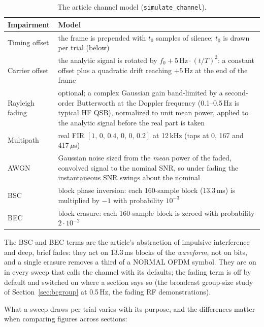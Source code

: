 \begin{table}[H]
    \centering
    \caption{The article channel model (\texttt{simulate\_channel}).}
    \label{tab:chan_article}
    \small
    \begin{tabular}{@{}lp{9.4cm}@{}}
    \toprule
    \textbf{Impairment} & \textbf{Model} \\
    \midrule
    Timing offset & the frame is prepended with $t_0$ samples of
        silence; $t_0$ is drawn per trial (below) \\
    Carrier offset & the analytic signal is rotated by
        $f_0 + 5\,\mathrm{Hz}\cdot(t/T)^2$: a constant offset plus a
        quadratic drift reaching $+5$\,Hz at the end of the frame \\
    Rayleigh fading & optional; a complex Gaussian gain band-limited by
        a second-order Butterworth at the Doppler frequency
        (0.1--0.5\,Hz is typical HF QSB), normalized to unit mean power,
        applied to the analytic signal before the real part is taken \\
    Multipath & real FIR $[1,\,0,\,0.4,\,0,\,0,\,0.2]$ at 12\,kHz
        (taps at 0, 167 and 417\,$\mu$s) \\
    AWGN & Gaussian noise sized from the \emph{mean} power of the
        faded, convolved signal to the nominal SNR, so under fading the
        instantaneous SNR swings about the nominal \\
    BSC & block phase inversion: each 160-sample block (13.3\,ms) is
        multiplied by $-1$ with probability $10^{-3}$ \\
    BEC & block erasure: each 160-sample block is zeroed with
        probability $2\cdot10^{-2}$ \\
    \bottomrule
    \end{tabular}
\end{table}

The BSC and BEC terms are the article's abstraction of impulsive
interference and deep, brief fades: they act on 13.3\,ms blocks of the
\emph{waveform}, not on bits, and a single erasure removes a third of a
NORMAL OFDM symbol.  They are on in every sweep that calls the channel
with its defaults; the fading term is off by default and switched on
where a section says so (the broadcast group-size study of
Section~\ref{sec:bcgroup} at 0.5\,Hz, the fading RF demonstrations).

What a sweep draws per trial varies with its purpose, and the
differences matter when comparing figures across sections:


